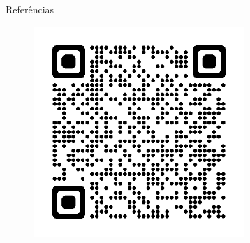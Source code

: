 \documentclass[final]{beamer}
\begin{document}
\begin{frame}[t]
\begin{columns}[t]
\begin{column}{0.9328981723\paperwidth}
\begin{block}{Referências}
\begin{multicols}{2}
	\begin{figure}
		\centering
		\vspace*{-52.143pt}\includegraphics[height=8cm]{images/qrcode2}
	\end{figure}

\end{multicols}

\end{block}

\end{column}
\end{columns}
\end{frame}
\end{document}
